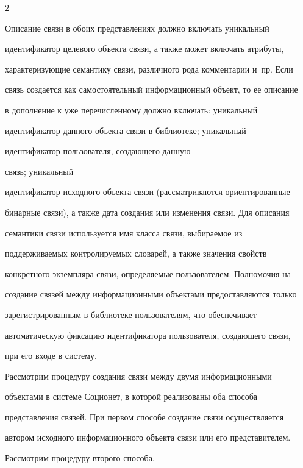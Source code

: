 \begin{multicols}{2}
  


  Описание связи в обоих представлениях должно включать уникальный 


идентификатор целевого объекта связи, а также может включать атрибуты, 


характеризующие семантику связи, различного рода комментарии и~пр. Если 


связь создается как самостоятельный информационный объект, то ее описание 


в дополнение к уже перечисленному должно включать: уникальный 


идентификатор данного объек\-та-свя\-зи в библиотеке; уникальный 


идентификатор пользователя, создающего данную %


связь; уникальный 


идентификатор исходного объек\-та связи (рассматриваются ориентированные 


бинарные связи), а также дата создания или изменения связи. Для описания 


семантики связи используется имя класса связи, выбираемое из 


поддерживаемых контролируемых словарей, а также значения свойств 


конкретного экземпляра связи, определяемые пользователем. Полномочия на 


создание связей между информационными объектами предоставляются только 


зарегистрированным в библиотеке пользователям, что обеспечивает 


автоматическую фиксацию идентификатора пользователя, создающего связи, 


при его входе в сис\-тему. 


{





}


  


  Рассмотрим процедуру создания связи между двумя информационными 


объектами в системе Соционет, в которой реализованы оба способа 


представления связей. При первом способе создание связи осуществляется 


автором исходного информационного объекта связи или его представителем. 


Рассмотрим процедуру второго способа. 



\end{multicols}
